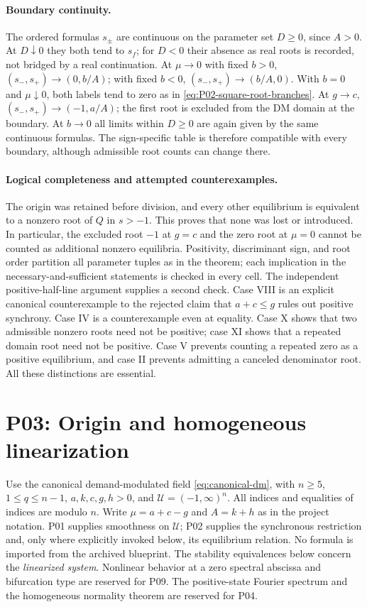 \documentclass[11pt]{article}
\newcommand{\Domain}{\mathcal{U}}
\theoremstyle{definition}
\theoremstyle{remark}
\begin{document}
\paragraph{Boundary continuity.}
The ordered formulas $s_\pm$ are continuous on the parameter set
$D\ge0$, since $A>0$. At $D\downarrow0$ they both tend to $s_f$;
for $D<0$ their absence as real roots is recorded, not bridged by
a real continuation. At $\mu\to0$ with fixed $b>0$,
$(s_-,s_+)\to(0,b/A)$; with fixed $b<0$,
$(s_-,s_+)\to(b/A,0)$. With $b=0$ and $\mu\downarrow0$, both labels
tend to zero as in \eqref{eq:P02-square-root-branches}. At $g\to c$,
$(s_-,s_+)\to(-1,a/A)$; the first root is excluded from the DM domain
at the boundary.
At $b\to0$ all limits within $D\ge0$ are again given by the same
continuous formulas. The sign-specific table is therefore compatible
with every boundary, although admissible root counts can change there.

\clearpage
\paragraph{Logical completeness and attempted counterexamples.}
The origin was retained before division, and every other equilibrium
is equivalent to a nonzero root of $Q$ in $s>-1$. This proves that
none was lost or introduced. In particular, the excluded root $-1$
at $g=c$ and the zero root at $\mu=0$ cannot be counted as additional
nonzero equilibria. Positivity, discriminant sign, and root order
partition all parameter tuples as in the theorem; each implication
in the necessary-and-sufficient statements is checked in every cell.
The independent positive-half-line argument supplies a second check.
Case VIII is an explicit canonical counterexample to the rejected
claim that $a+c\le g$ rules out positive synchrony. Case IV is a
counterexample even at equality. Case X shows that two admissible
nonzero roots need not be positive; case XI shows that a repeated
domain root need not be positive. Case V prevents counting a repeated
zero as a positive equilibrium, and case II prevents admitting a
canceled denominator root. All these distinctions are essential.


\section{P03: Origin and homogeneous linearization}
\label{sec:P03}
Use the canonical demand-modulated field \eqref{eq:canonical-dm},
with $n\ge5$, $1\le q\le n-1$, $a,k,c,g,h>0$, and
$\Domain=(-1,\infty)^n$. All indices and equalities of indices are
modulo $n$. Write $\mu=a+c-g$ and $A=k+h$ as in the project notation.
P01 supplies smoothness on $\Domain$; P02 supplies the synchronous
restriction and, only where explicitly invoked below, its equilibrium
relation. No formula is imported from the archived blueprint.
The stability equivalences below concern the \emph{linearized system}.
Nonlinear behavior at a zero spectral abscissa and bifurcation type
are reserved for P09. The positive-state Fourier spectrum and the
homogeneous normality theorem are reserved for P04.
\end{document}
